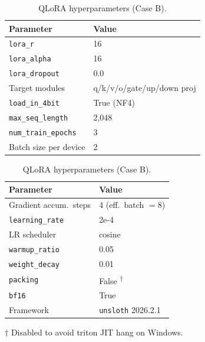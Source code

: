 \documentclass[twocolumn]{article}
\begin{document}
\begin{table}[t]
  \centering
  \caption{QLoRA hyperparameters (Case B).}
  \label{tab:lora_hp}
  \begin{minipage}[t]{0.48\linewidth}
    \centering
    \begin{tabular}{ll}
      \toprule
      Parameter & Value \\
      \midrule
      \texttt{lora\_r}                      & 16 \\
      \texttt{lora\_alpha}                  & 16 \\
      \texttt{lora\_dropout}                & 0.0 \\
      Target modules                        & q/k/v/o/gate/up/down proj \\
      \texttt{load\_in\_4bit}               & True (NF4) \\
      \texttt{max\_seq\_length}             & 2,048 \\
      \texttt{num\_train\_epochs}           & 3 \\
      Batch size per device                 & 2 \\
      \bottomrule
    \end{tabular}
  \end{minipage}
  \hfill
  \begin{minipage}[t]{0.48\linewidth}
    \centering
    \begin{tabular}{ll}
      \toprule
      Parameter & Value \\
      \midrule
      Gradient accum.\ steps                & 4 (eff.\ batch $= 8$) \\
      \texttt{learning\_rate}               & 2e-4 \\
      LR scheduler                          & cosine \\
      \texttt{warmup\_ratio}                & 0.05 \\
      \texttt{weight\_decay}                & 0.01 \\
      \texttt{packing}                      & False \textsuperscript{$\dagger$} \\
      \texttt{bf16}                         & True \\
      Framework                             & \texttt{unsloth} 2026.2.1 \\
      \bottomrule
    \end{tabular}
  \end{minipage}
  \par\smallskip
  \raggedright\footnotesize $\dagger$ Disabled to avoid triton JIT hang on Windows.
\end{table}
\end{document}
